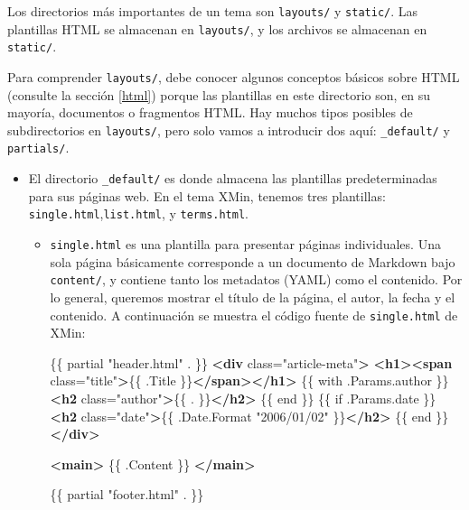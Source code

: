 \documentclass[12pt,]{krantz}
\makeatletter
\newenvironment{Shaded}{\begin{snugshade}}{\end{snugshade}}
\newcommand{\KeywordTok}[1]{\textcolor[rgb]{0.13,0.29,0.53}{\textbf{#1}}}
\newcommand{\NormalTok}[1]{#1}
\newcommand{\OtherTok}[1]{\textcolor[rgb]{0.56,0.35,0.01}{#1}}
\newcommand{\StringTok}[1]{\textcolor[rgb]{0.31,0.60,0.02}{#1}}
\newenvironment{kframe}{%
\medskip{}
\setlength{\fboxsep}{.8em}
 \def\at@end@of@kframe{}%
 \ifinner\ifhmode%
  \def\at@end@of@kframe{\end{minipage}}%
  \begin{minipage}{\columnwidth}%
 \fi\fi%
 \def\FrameCommand##1{\hskip\@totalleftmargin \hskip-\fboxsep
 \colorbox{shadecolor}{##1}\hskip-\fboxsep
     \hskip-\linewidth \hskip-\@totalleftmargin \hskip\columnwidth}%
 \MakeFramed {\advance\hsize-\width
   \@totalleftmargin\z@ \linewidth\hsize
   \@setminipage}}%
 {\par\unskip\endMakeFramed%
 \at@end@of@kframe}
\renewenvironment{Shaded}{\begin{kframe}}{\end{kframe}}
\theoremstyle{definition}
\theoremstyle{definition}
\theoremstyle{definition}
\theoremstyle{remark}
\makeatother
\begin{document}
Los directorios más importantes de un tema son \texttt{layouts/} y
\texttt{static/}. Las plantillas HTML se almacenan en \texttt{layouts/},
y los archivos se almacenan en \texttt{static/}.

Para comprender \texttt{layouts/}, debe conocer algunos conceptos
básicos sobre HTML (consulte la sección \ref{html}) porque las
plantillas en este directorio son, en su mayoría, documentos o
fragmentos HTML. Hay muchos tipos posibles de subdirectorios en
\texttt{layouts/}, pero solo vamos a introducir dos aquí:
\texttt{\_default/} y \texttt{partials/}.

\begin{itemize}
\item
  El directorio \texttt{\_default/} es donde almacena
  las plantillas predeterminadas para sus páginas web. En el tema XMin,
  tenemos tres plantillas: \texttt{single.html},\texttt{list.html}, y
  \texttt{terms.html}.

  \begin{itemize}
  \item
    \texttt{single.html} es una plantilla para
    presentar páginas individuales. Una sola página básicamente
    corresponde a un documento de Markdown bajo \texttt{content/}, y
    contiene tanto los metadatos (YAML) como el contenido. Por lo
    general, queremos mostrar el título de la página, el autor, la fecha
    y el contenido. A continuación se muestra el código fuente de
    \texttt{single.html} de XMin:

\begin{Shaded}
\begin{Highlighting}[]
\NormalTok{\{\{ partial "header.html" . \}\}}
\KeywordTok{<div}\OtherTok{ class=}\StringTok{"article-meta"}\KeywordTok{>}
\KeywordTok{<h1><span}\OtherTok{ class=}\StringTok{"title"}\KeywordTok{>}\NormalTok{\{\{ .Title \}\}}\KeywordTok{</span></h1>}
\NormalTok{\{\{ with .Params.author \}\}}
\KeywordTok{<h2}\OtherTok{ class=}\StringTok{"author"}\KeywordTok{>}\NormalTok{\{\{ . \}\}}\KeywordTok{</h2>}
\NormalTok{\{\{ end \}\}}
\NormalTok{\{\{ if .Params.date \}\}}
\KeywordTok{<h2}\OtherTok{ class=}\StringTok{"date"}\KeywordTok{>}\NormalTok{\{\{ .Date.Format "2006/01/02" \}\}}\KeywordTok{</h2>}
\NormalTok{\{\{ end \}\}}
\KeywordTok{</div>}

\KeywordTok{<main>}
\NormalTok{\{\{ .Content \}\}}
\KeywordTok{</main>}

\NormalTok{\{\{ partial "footer.html" . \}\}}
\end{Highlighting}
\end{Shaded}


\end{itemize}
\end{itemize}
\end{document}
